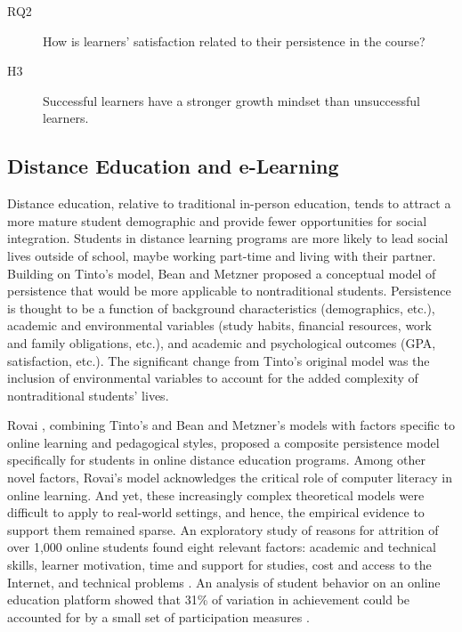 \documentclass{sigchi}\usepackage[]{graphicx}\usepackage[]{color}
\begin{document}
\begin{description}
  \item[RQ2] How is learners' satisfaction related to their persistence in the course?
  \item[H3] Successful learners have a stronger growth mindset than unsuccessful learners.
\end{description}

\subsection{Distance Education and e-Learning}

Distance education, relative to traditional in-person education, tends to attract a more mature student demographic and provide fewer opportunities for social integration. Students in distance learning programs are more likely to lead social lives outside of school, maybe working part-time and living with their partner. Building on Tinto's model, Bean and Metzner \citeyear{bean1985conceptual} proposed a conceptual model of persistence that would be more applicable to nontraditional students. Persistence is thought to be a function of background characteristics (demographics, etc.), academic and environmental variables (study habits, financial resources, work and family obligations, etc.), and academic and psychological outcomes (GPA, satisfaction, etc.). The significant change from Tinto's original model was the inclusion of environmental variables to account for the added complexity of nontraditional students' lives.

Rovai \citeyear{rovai2003search}, combining Tinto's and Bean and Metzner's models with factors specific to online learning and pedagogical styles, proposed a composite persistence model specifically for students in online distance education programs. Among other novel factors, Rovai's model acknowledges the critical role of computer literacy in online learning. And yet, these increasingly complex theoretical models were difficult to apply to real-world settings, and hence, the empirical evidence to support them remained sparse. An exploratory study of reasons for attrition of over 1,000 online students found eight relevant factors: academic and technical skills, learner motivation, time and support for studies, cost and access to the Internet, and technical problems \cite{muilenburg2005student}. An analysis of student behavior on an online education platform showed that 31\% of variation in achievement could be accounted for by a small set of participation measures \cite{morris2005tracking}.
\end{document}
